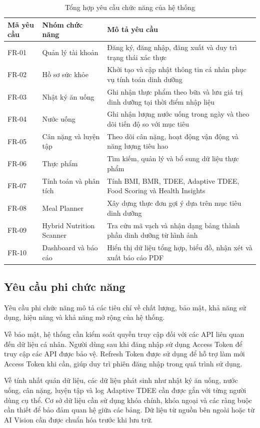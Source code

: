 \documentclass[12pt, a4paper]{report}
\begin{document}
\begin{table}[htbp]
\centering
\caption{Tổng hợp yêu cầu chức năng của hệ thống}
\begin{tabular}{|p{4cm}|p{4cm}|p{7cm}|}
\hline
\textbf{Mã yêu cầu} & \textbf{Nhóm chức năng} & \textbf{Mô tả yêu cầu} \\
\hline
FR-01 & Quản lý tài khoản & Đăng ký, đăng nhập, đăng xuất và duy trì trạng thái xác thực \\
\hline
FR-02 & Hồ sơ sức khỏe & Khởi tạo và cập nhật thông tin cá nhân phục vụ tính toán dinh dưỡng \\
\hline
FR-03 & Nhật ký ăn uống & Ghi nhận thực phẩm theo bữa và lưu giá trị dinh dưỡng tại thời điểm nhập liệu \\
\hline
FR-04 & Nước uống & Ghi nhận lượng nước uống trong ngày và theo dõi tiến độ so với mục tiêu \\
\hline
FR-05 & Cân nặng và luyện tập & Theo dõi cân nặng, hoạt động vận động và năng lượng tiêu hao \\
\hline
FR-06 & Thực phẩm & Tìm kiếm, quản lý và bổ sung dữ liệu thực phẩm \\
\hline
FR-07 & Tính toán và phân tích & Tính BMI, BMR, TDEE, Adaptive TDEE, Food Scoring và Health Insights \\
\hline
FR-08 & Meal Planner & Xây dựng thực đơn gợi ý dựa trên mục tiêu dinh dưỡng \\
\hline
FR-09 & Hybrid Nutrition Scanner & Tra cứu mã vạch và nhận dạng bảng thành phần dinh dưỡng từ hình ảnh \\
\hline
FR-10 & Dashboard và báo cáo & Hiển thị dữ liệu tổng hợp, biểu đồ, nhận xét và xuất báo cáo PDF \\
\hline
\end{tabular}
\end{table}
\subsection{Yêu cầu phi chức năng}Yêu cầu phi chức năng mô tả các tiêu chí về chất lượng, bảo mật, khả năng sử dụng, hiệu năng và khả năng mở rộng của hệ thống.

Về bảo mật, hệ thống cần kiểm soát quyền truy cập đối với các API liên quan đến dữ liệu cá nhân. Người dùng sau khi đăng nhập sử dụng Access Token để truy cập các API được bảo vệ. Refresh Token được sử dụng để hỗ trợ làm mới Access Token khi cần, giúp duy trì phiên đăng nhập trong quá trình sử dụng.

Về tính nhất quán dữ liệu, các dữ liệu phát sinh như nhật ký ăn uống, nước uống, cân nặng, luyện tập và log Adaptive TDEE cần được gắn với từng người dùng cụ thể. Cơ sở dữ liệu cần sử dụng khóa chính, khóa ngoại và các ràng buộc cần thiết để bảo đảm quan hệ giữa các bảng. Dữ liệu từ nguồn bên ngoài hoặc từ AI Vision cần được chuẩn hóa trước khi lưu trữ.
\end{document}
